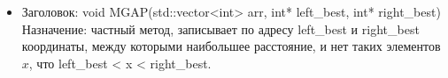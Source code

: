 \documentclass[a4paper,12pt]{article}
\begin{document}
{{\begin{itemize}
\begin{figure}[h!]
	{\\Рисунок 4 — solve, ч3}
\end{figure}
\newpage 
\item Заголовок: void MGAP(std::vector<int> arr, int* left\_best, int* right\_best)\\
Назначение: частный метод, записывает по адресу left\_best и right\_best координаты, между которыми наибольшее расстояние, и нет таких элементов $x$, что left\_best < x < right\_best. 

\end{itemize}}}
\end{document}
